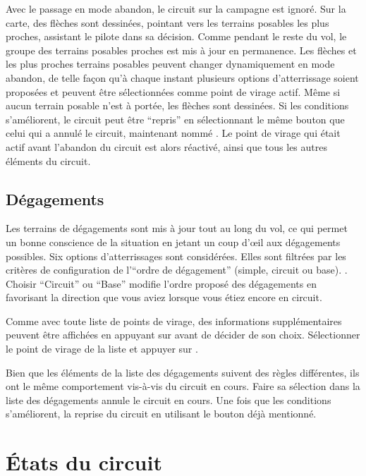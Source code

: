 Avec le passage en mode abandon, le circuit sur la campagne est ignoré. Sur la carte, des flèches
sont dessinées, pointant vers les terrains posables les plus proches,
assistant le pilote dans sa décision. Comme pendant le reste du vol, le groupe des terrains
posables proches est mis à jour en permanence. Les flèches et les plus proches terrains posables peuvent changer
dynamiquement en mode abandon, de telle façon qu'à chaque instant plusieurs options d'atterrissage soient 
proposées et peuvent être sélectionnées comme point de virage actif. Même si aucun
terrain posable n'est à portée, les flèches sont dessinées.
Si les conditions s'améliorent, le circuit peut être ``repris'' en sélectionnant le même
bouton que celui qui a annulé le circuit, maintenant nommé . Le point de virage
qui était actif avant l'abandon du circuit est alors réactivé, ainsi que tous les autres éléments du circuit.

\subsection*{Dégagements}\label{sec:alternates}
Les terrains de dégagements sont mis à jour tout au long du vol, ce qui permet un bonne conscience
de la situation en jetant un coup d'œil aux dégagements possibles. Six options d'atterrissages
sont considérées. Elles sont filtrées par les critères de configuration de l'``ordre de dégagement''
(simple, circuit ou base). .
Choisir ``Circuit'' ou ``Base'' modifie l'ordre proposé des dégagements en favorisant 
la direction que vous aviez lorsque vous étiez encore en circuit.

Comme avec toute liste de points de virage, des informations supplémentaires peuvent être affichées en appuyant sur  avant de décider de son choix. Sélectionner le point de virage de la liste et appuyer sur .

Bien que les éléments de la liste des dégagements suivent des règles différentes, ils ont le même comportement vis-à-vis du circuit en cours. Faire sa sélection dans la liste des dégagements annule le circuit en cours. Une fois que les conditions s'améliorent, la reprise du circuit en utilisant le bouton déjà mentionné.


\section{États du circuit}\label{sec:task-status}

